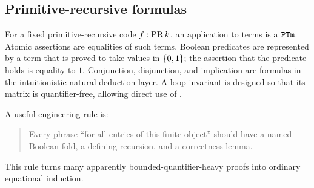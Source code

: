 \subsection{Primitive-recursive formulas}

For a fixed primitive-recursive code \(f:\mathrm{PR}\,k\), an application to terms is
a \(\mathtt{PTm}\).  Atomic assertions are equalities of such terms.  Boolean
predicates are represented by a term that is proved to take values in
\(\{0,1\}\); the assertion that the predicate holds is equality to \(1\).
Conjunction, disjunction, and implication are formulas in the intuitionistic
natural-deduction layer.  A loop invariant is designed so that its matrix is
quantifier-free, allowing direct use of .

A useful engineering rule is:

\begin{quote}
Every phrase ``for all entries of this finite object'' should have a named
Boolean fold, a defining recursion, and a correctness lemma.
\end{quote}

This rule turns many apparently bounded-quantifier-heavy proofs into ordinary
equational induction.
